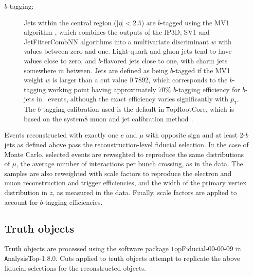 \begin{description}
\item[$b$-tagging:] Jets within the central region ($|\eta| < 2.5$) are $b$-tagged using the MV1 algorithm 
\cite{btagcom,btagptrel},
which combines the outputs of the IP3D, SV1 and JetFitterCombNN algorithms
into a multivariate discriminant $w$ with values between zero and one. 
Light-quark and gluon jets tend to have values close to zero, and 
$b$-flavored jets close to one, with charm jets somewhere in between. Jets are defined as being $b$-tagged if the MV1 weight $w$ is larger than a cut value 0.7892, which corresponds to the $b$-tagging working 
point having approximately 70\% $b$-tagging efficiency for $b$-jets in \ttbar\ events, although the exact efficiency varies significantly with $p_T$. The $b$-tagging calibration used is the default in {\texttt TopRootCore}, which is based on the system8 muon and jet calibration method~\cite{btagsys8}.
\end{description}
Events reconstructed with exactly one $e$ and $\mu$ with opposite sign and at least 2-$b$ jets as defined above pass the reconstruction-level fiducial selection. In the case of Monte Carlo, selected events are reweighted to reproduce the same distributions of $\mu$, the average number of interactions per bunch crossing, as in the data. The samples are also reweighted with scale factors to reproduce the electron and muon reconstruction and trigger efficiencies, and the width of the primary vertex distribution in $z$, as measured in the data. Finally, scale factors are applied to account for $b$-tagging efficiencies.
\subsection{Truth objects}
Truth objects are processed using the software package {\texttt TopFiducial-00-00-09} in {\texttt AnalysisTop-1.8.0}. Cuts applied to truth objects attempt to replicate the above fiducial selections for the reconstructed objects.

